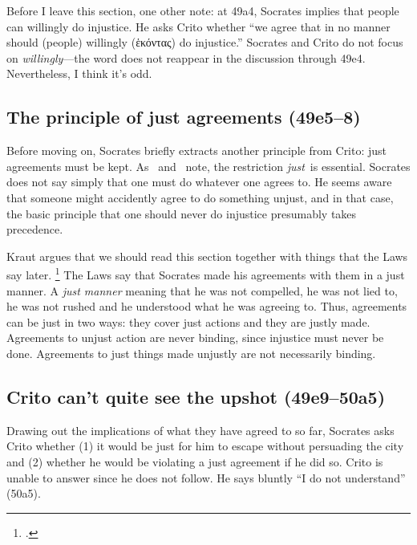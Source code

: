 \documentclass[12pt,letterpaper]{article}
\begin{document}
Before I leave this section, one other note: at 49a4, Socrates implies that people can willingly do injustice.
He asks Crito whether ``we agree that in no manner should (people) willingly (\textgreek{ἑκόντας}) do injustice.''
Socrates and Crito do not focus on \textit{willingly}---the word does not reappear in the discussion through 49e4.
Nevertheless, I think it's odd.

\subsection*{The principle of just agreements (49e5--8)}

Before moving on, Socrates briefly extracts another principle from Crito: just agreements must be kept.
As~\cite{kraut-socrates-state-1984} and~\cite{brickhouse-smith2004-plato-trial-of-socrates} note, the restriction \emph{just}~is essential.
Socrates does not say simply that one must do whatever one agrees to.
He seems aware that someone might accidently agree to do something unjust, and in that case, the basic principle that one should never do injustice presumably takes precedence.

Kraut argues that we should read this section together with things that the Laws say later.%
\footcite[][32]{kraut-socrates-state-1984}
The Laws say that Socrates made his agreements with them in a just manner.
A \emph{just manner} meaning that he was not compelled, he was not lied to, he was not rushed and he understood what he was agreeing to.
Thus, agreements can be just in two ways: they cover just actions and they are justly made.
Agreements to unjust action are never binding, since injustice must never be done.
Agreements to just things made unjustly are not necessarily binding.

\subsection*{Crito can't quite see the upshot (49e9--50a5)}

Drawing out the implications of what they have agreed to so far, Socrates
asks Crito whether (1) it would be just for him to escape without
persuading the city and (2) whether he would be violating a just agreement
if he did so.
Crito is unable to answer since he does not follow.
He says bluntly ``I do not understand'' (50a5).
\end{document}
